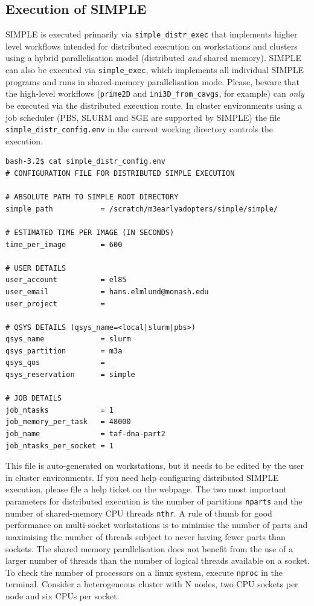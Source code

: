 \documentclass[a4paper,11pt]{article}
\newcommand{\prgname}[1]{\textcolor{NavyBlue}{\texttt{#1}}}
\begin{document}
\subsection{Execution of SIMPLE}
SIMPLE is executed primarily via \texttt{simple\_distr\_exec} that implements higher level workflows intended for distributed execution on workstations and clusters using a hybrid parallelisation model (distributed \textit{and} shared memory). SIMPLE can also be executed via \texttt{simple\_exec}, which implements all individual SIMPLE programs and runs in shared-memory parallelisation mode. Please, beware that the high-level workflows (\prgname{prime2D} and \prgname{ini3D\_from\_cavgs}, for example) can \textit{only} be executed via the distributed execution route. In cluster environments using a job scheduler (PBS, SLURM and SGE are supported by SIMPLE) the file \texttt{simple\_distr\_config.env} in the current working directory controls the execution.
\begin{Verbatim}[commandchars=+\[\],fontsize=\small,breaklines=true]
bash-3.2$ cat simple_distr_config.env 
# CONFIGURATION FILE FOR DISTRIBUTED SIMPLE EXECUTION

# ABSOLUTE PATH TO SIMPLE ROOT DIRECTORY
simple_path           = /scratch/m3earlyadopters/simple/simple/

# ESTIMATED TIME PER IMAGE (IN SECONDS)
time_per_image        = 600

# USER DETAILS
user_account          = el85 
user_email            = hans.elmlund@monash.edu
user_project          = 

# QSYS DETAILS (qsys_name=<local|slurm|pbs>)
qsys_name             = slurm
qsys_partition        = m3a
qsys_qos              =
qsys_reservation      = simple

# JOB DETAILS
job_ntasks            = 1
job_memory_per_task   = 48000
job_name              = taf-dna-part2
job_ntasks_per_socket = 1
\end{Verbatim}
This file is auto-generated on workstations, but it needs to be edited by the user in cluster environments. If you need help configuring distributed SIMPLE execution, please file a help ticket on the webpage. The two most important parameters for distributed execution is the number of partitions \texttt{nparts} and the number of shared-memory CPU threads \texttt{nthr}. A rule of thumb for good performance on multi-socket workstations is to minimise the number of parts and maximising the number of threads subject to never having fewer parts than sockets. The shared memory parallelisation does not benefit from the use of a larger number of threads than the number of logical threads available on a socket. To check the number of processors on a linux system, execute \texttt{nproc} in the terminal. Consider a heterogeneous cluster with N nodes, two CPU sockets per node and six CPUs per socket.
\end{document}
